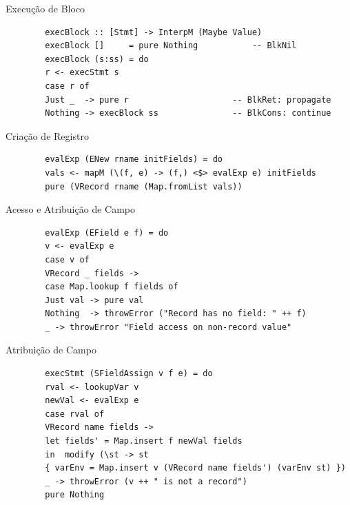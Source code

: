 \begin{frame}[fragile]{Execução de Bloco}

    \begin{lstlisting}
        execBlock :: [Stmt] -> InterpM (Maybe Value)
        execBlock []     = pure Nothing           -- BlkNil
        execBlock (s:ss) = do
        r <- execStmt s
        case r of
        Just _  -> pure r                     -- BlkRet: propagate
        Nothing -> execBlock ss               -- BlkCons: continue
    \end{lstlisting}
\end{frame}

\begin{frame}[fragile]{Criação de Registro}

    \begin{lstlisting}
        evalExp (ENew rname initFields) = do
        vals <- mapM (\(f, e) -> (f,) <$> evalExp e) initFields
        pure (VRecord rname (Map.fromList vals))
    \end{lstlisting}
\end{frame}

\begin{frame}[fragile]{Acesso e Atribuição de Campo}

    \begin{lstlisting}
        evalExp (EField e f) = do
        v <- evalExp e
        case v of
        VRecord _ fields ->
        case Map.lookup f fields of
        Just val -> pure val
        Nothing  -> throwError ("Record has no field: " ++ f)
        _ -> throwError "Field access on non-record value"
    \end{lstlisting}
\end{frame}

\begin{frame}[fragile]{Atribuição de Campo}

    \begin{lstlisting}
        execStmt (SFieldAssign v f e) = do
        rval <- lookupVar v
        newVal <- evalExp e
        case rval of
        VRecord name fields ->
        let fields' = Map.insert f newVal fields
        in  modify (\st -> st
        { varEnv = Map.insert v (VRecord name fields') (varEnv st) })
        _ -> throwError (v ++ " is not a record")
        pure Nothing
    \end{lstlisting}
\end{frame}

